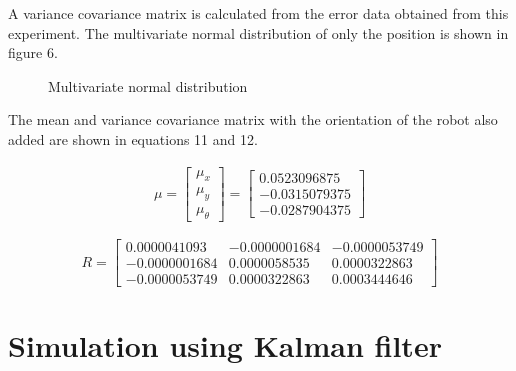 \documentclass[a4paper]{article}
\begin{document}
A variance covariance matrix is ​​calculated from the error data obtained from this experiment. 
The multivariate normal distribution of only the position is shown in figure 6.
\begin{figure}[H]
    \centerline{}
    \caption{Multivariate normal distribution}
\end{figure}

The mean and variance covariance matrix with the orientation of the robot 
also added are shown in equations 11 and 12.

\begin{equation}
    \begin{split}
     \mu = 
     \begin{bmatrix}
        \mu_x \\
        \mu_y \\
        \mu_\theta
     \end{bmatrix}
     =
     \begin{bmatrix}
        0.0523096875 \\
        -0.0315079375 \\
        -0.0287904375
     \end{bmatrix}
    \end{split}
    \label{eq:11} 
\end{equation}

\begin{equation}
    R = 
    \begin{bmatrix}
        0.0000041093 & -0.0000001684 & -0.0000053749 \\
        -0.0000001684 & 0.0000058535 & 0.0000322863 \\
        -0.0000053749 & 0.0000322863 & 0.0003444646 
    \end{bmatrix}
    \label{eq:12} 
\end{equation}

\section{Simulation using Kalman filter}
\end{document}
